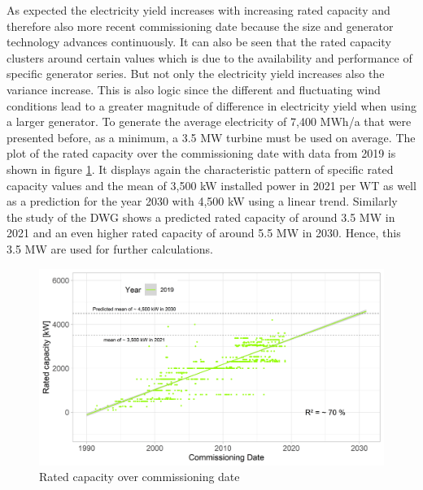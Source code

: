 \documentclass[a4paper,11pt]{article}
\begin{document}
As expected the electricity yield increases with increasing rated capacity and therefore also more recent commissioning date because the size and generator technology advances continuously. It can also be seen that the rated capacity clusters around certain values which is due to the availability and performance of specific generator series. But not only the electricity yield increases also the variance increase. This is also logic since the different and fluctuating wind conditions lead to a greater magnitude of difference in electricity yield when using a larger generator. To generate the average electricity of 7,400 MWh/a that were presented before, as a minimum, a 3.5 MW turbine must be used on average. The plot of the rated capacity over the commissioning date with data from 2019 is shown in figure \ref{fig:ratedcapacity}. It displays again the characteristic pattern of specific rated capacity values and the mean of 3,500 kW installed power in 2021 per WT as well as a prediction for the year 2030 with 4,500 kW using a linear trend. Similarly the study of the DWG shows a predicted rated capacity of around 3.5 MW in 2021 and an even higher rated capacity of around 5.5 MW in 2030. Hence, this 3.5 MW are used for further calculations.
\begin{figure}

{\centering \includegraphics[width=1\linewidth]{data/Amprion/results_of_analysis/rated_capacity_over_commissioning} 

}

\caption{Rated capacity over commissioning date}\label{fig:ratedcapacity}
\end{figure}
\end{document}
